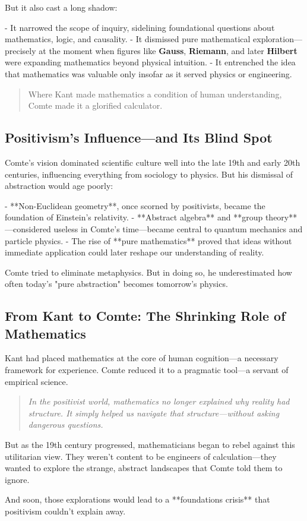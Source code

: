 But it also cast a long shadow:

- It narrowed the scope of inquiry, sidelining foundational questions about mathematics, logic, and causality.
- It dismissed pure mathematical exploration—precisely at the moment when figures like \textbf{Gauss}, \textbf{Riemann}, and later \textbf{Hilbert} were expanding mathematics beyond physical intuition.
- It entrenched the idea that mathematics was valuable only insofar as it served physics or engineering.

\begin{quote}
Where Kant made mathematics a condition of human understanding,  
Comte made it a glorified calculator.
\end{quote}

\subsection*{Positivism’s Influence—and Its Blind Spot}

Comte’s vision dominated scientific culture well into the late 19th and early 20th centuries, influencing everything from sociology to physics. But his dismissal of abstraction would age poorly:

- **Non-Euclidean geometry**, once scorned by positivists, became the foundation of Einstein’s relativity.
- **Abstract algebra** and **group theory**—considered useless in Comte’s time—became central to quantum mechanics and particle physics.
- The rise of **pure mathematics** proved that ideas without immediate application could later reshape our understanding of reality.

\begin{tcolorbox}[colback=white, colframe=black!50!white, title={The Irony of Positivism}]
Comte tried to eliminate metaphysics.  
But in doing so, he underestimated how often today’s "pure abstraction" becomes tomorrow’s physics.
\end{tcolorbox}

\subsection*{From Kant to Comte: The Shrinking Role of Mathematics}

Kant had placed mathematics at the core of human cognition—a necessary framework for experience.  
Comte reduced it to a pragmatic tool—a servant of empirical science.

\begin{quote}
\textit{In the positivist world, mathematics no longer explained why reality had structure.  
It simply helped us navigate that structure—without asking dangerous questions.}
\end{quote}

But as the 19th century progressed, mathematicians began to rebel against this utilitarian view.  
They weren’t content to be engineers of calculation—they wanted to explore the strange, abstract landscapes that Comte told them to ignore.

And soon, those explorations would lead to a **foundations crisis** that positivism couldn’t explain away.

